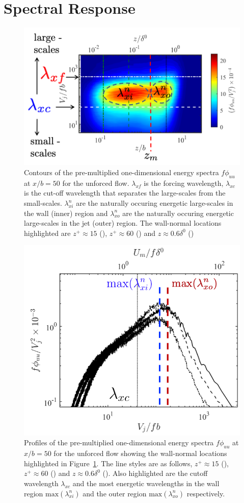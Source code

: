\section{Spectral Response}

\begin{figure}[h!]
	\centering
	\includegraphics[width=.65\textwidth]{pics/spectra50Unforced.png}
	\caption{Contours of the pre-multiplied one-dimensional energy spectra $f\phi_{uu}$ at $x/b=50$ for the unforced flow. $\lambda_{xf}$ is the forcing wavelength, $\lambda_{xc}$ is the cut-off wavelength that separates the large-scales from the small-scales. $\lambda_{xi}^n$ are the naturally occuring energetic large-scales in the wall (inner) region and $\lambda_{xo}^n$ are the naturally occuring energetic large-scales in the jet (outer) region. The wall-normal locations highlighted are $z^+\approx 15$ (\textcolor{green}{\chain}), $z^+\approx 60$ (\textcolor{green}{\dashed}) and $z\approx 0.6\delta^0$ (\textcolor{black}{\dotted})}
	\label{fg:spec50uf}
\end{figure}

\begin{figure}[h!]
	\centering
	\includegraphics[width=.65\textwidth]{pics/spectra50LineUnforced.png}
	\caption{Profiles of the pre-multiplied one-dimensional energy spectra $f\phi_{uu}$ at $x/b=50$ for the unforced flow showing the wall-normal locations highlighted in Figure~\ref{fg:spec50uf}. The line styles are as follows, $z^+\approx 15$ (\textcolor{black}{\chain}), $z^+\approx 60$ (\textcolor{black}{\dashed}) and $z\approx 0.6\delta^0$ (\textcolor{black}{\full}). Also highlighted are the cutoff wavelength $\lambda_{xc}$ and the most energetic wavelengths in the wall region $\textrm{max}(\lambda_{xi}^n)$ and the outer region $\textrm{max}(\lambda_{xo}^n)$ respectively. }
	\label{fg:spec50lnuf}
\end{figure}


